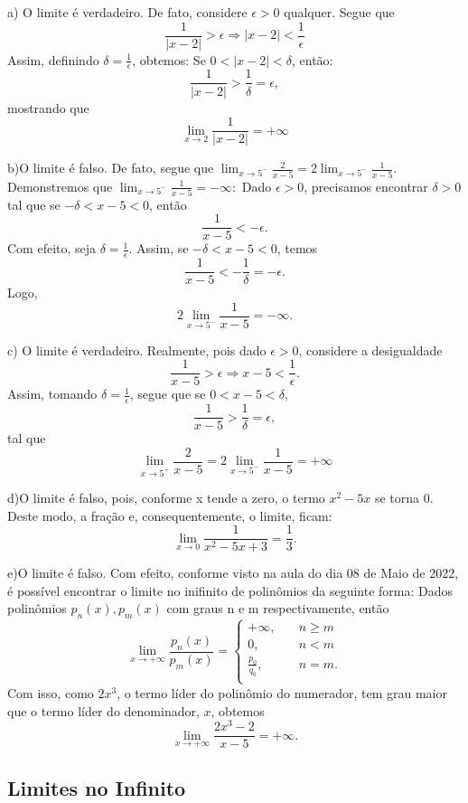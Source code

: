 \begin{sol*}
a) O limite \'e verdadeiro. De fato, considere $\epsilon > 0$ qualquer. Segue que 
$$
\frac{1}{|x - 2|} > \epsilon \Rightarrow |x - 2| < \frac{1}{\epsilon}
$$
Assim, definindo $\delta = \frac{1}{\epsilon}$, obtemos: Se $0 < |x - 2| < \delta$, ent\~ao:
$$
\frac{1}{|x - 2|} > \frac{1}{\delta} = \epsilon,
$$
mostrando que 
$$
\lim_{x\to2}\frac{1}{|x - 2|}=+\infty
$$

b)O limite \'e falso. De fato, segue que  $\lim_{x\to5^-}\frac{2}{x - 5} = 2\lim_{x\to5^-}\frac{1}{x - 5}.$ Demonstremos que $\lim_{x\to5^-}\frac{1}{x - 5} = -\infty:$ Dado $\epsilon > 0$, precisamos encontrar $\delta > 0$ tal que se $-\delta < x - 5< 0$, ent\~ao
$$
\frac{1}{x - 5} < -\epsilon.
$$ 
Com efeito, seja $\delta = \frac{1}{\epsilon}.$ Assim, se $-\delta < x - 5< 0$, temos
$$
\frac{1}{x - 5} < -\frac{1}{\delta} = -\epsilon.
$$
Logo, 
$$
2\lim_{x\to5^-}\frac{1}{x - 5} = -\infty.
$$

c) O limite \'e verdadeiro. Realmente, pois dado $\epsilon > 0$, considere a desigualdade
$$
\frac{1}{x - 5} > \epsilon \Rightarrow x - 5 < \frac{1}{\epsilon}.
$$
Assim, tomando $\delta = \frac{1}{\epsilon}$, segue que se $0 < x - 5 < \delta$, 
$$
\frac{1}{x - 5} > \frac{1}{\delta} = \epsilon,
$$
tal que 
$$
\lim_{x\to5^+}\frac{2}{x - 5} = 2\lim_{x\to5^-}\frac{1}{x - 5} = +\infty
$$

d)O limite \'e falso, pois, conforme x tende a zero, o termo $x^2 - 5x$ se torna 0. Deste modo, a fra\c c\~ao e, consequentemente, o limite, ficam:
$$
\lim_{x\to0}\frac{1}{x^2 - 5x + 3} = \frac{1}{3}.
$$

e)O limite \'e falso. Com efeito, conforme visto na aula do dia 08 de Maio de 2022, \'e poss\'ivel encontrar o limite no inifinito de polin\^omios da seguinte forma: Dados polin\^omios $p_n(x), p_m(x)$ com graus n e m respectivamente, ent\~ao
$$
\lim_{x\to+\infty}\frac{p_n(x)}{p_m(x)} = 
\left\{\begin{array}{ll}
	+\infty, & \quad n\geq{m}\\
	0, & \quad n < m\\
	\frac{p_0}{q_0}, & \quad n = m.\\
\end{array}\right.
$$
Com isso, como $2x^3$, o termo l\'ider do polin\^omio do numerador, tem grau maior que o termo l\'ider do denominador, $x$, obtemos
$$
\lim_{x\to+\infty}\frac{2x^3 - 2}{x-5} = +\infty.
$$
\qedsymbol
\end{sol*}

\subsection{Limites no Infinito}
